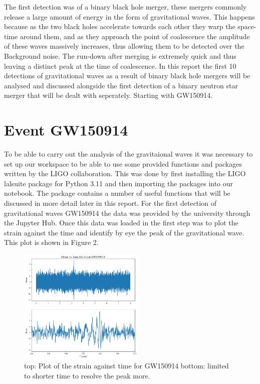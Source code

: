 \documentclass[]{article}
\begin{document}
The first detection was of a binary black hole merger, these mergers commonly
release a large amount of energy in the form of gravitational waves. This happens
because as the two black holes accelerate towards each other they warp the
space-time around them, and as they approach the point of coalescence the amplitude
of these waves massively increases, thus allowing them to be detected over the Background
noise. The run-down after merging is extremely quick and thus leaving a distinct peak
at the time of coalescence. In this report the first 10 detections of gravitational waves
as a result of binary black hole mergers will be analysed and discussed alongside the first detection
of a binary neutron star merger that will be dealt with seperately. Starting with GW150914.

\section*{Event GW150914}
To be able to carry out the analysis of the gravitaional waves it was necessary to set
up our workspace to be able to use some provided functions and packages written by the
LIGO collaboration. This was done by first installing the LIGO lalsuite package for Python 3.11
and then importing the packages into our notebook. The package contains a number of useful
functions that will be discussed in more detail later in this report.
For the first detection of gravitational waves GW150914 the data was provided
by the university through the Jupyter Hub. Once this data was loaded in
the first step was to plot the strain against the time and identify by eye the peak
of the gravitational wave. This plot is shown in Figure 2.
\begin{figure}
    \includegraphics[width=6cm]{images/Signal_gw150914.png}
    \caption{top: Plot of the strain against time for GW150914 bottom:
    limited to shorter time to resolve the peak more.}
    \label{fig:GW150914}
\end{figure}
\newline
\end{document}
